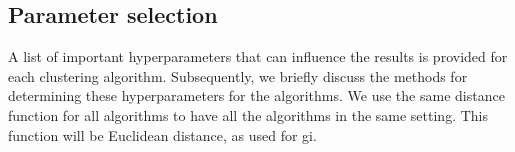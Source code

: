 

\subsection{Parameter selection}
A list of important hyperparameters that can influence the results is provided for each clustering algorithm.
Subsequently, we briefly discuss the methods for determining these hyperparameters for the algorithms. \newline
We use the same distance function for all algorithms to have all the algorithms in the same setting.
This function will be Euclidean distance, as used for \gls{gi}.
